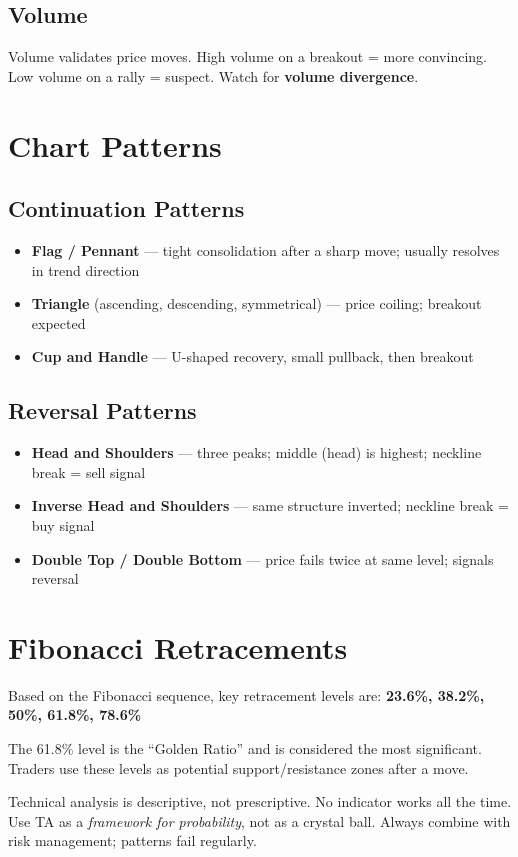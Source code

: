 \subsection{Volume}
Volume validates price moves. High volume on a breakout = more convincing.
Low volume on a rally = suspect. Watch for \textbf{volume divergence}.

\section{Chart Patterns}

\subsection{Continuation Patterns}
\begin{itemize}
  \item \textbf{Flag / Pennant} — tight consolidation after a sharp move; usually resolves in trend direction
  \item \textbf{Triangle} (ascending, descending, symmetrical) — price coiling; breakout expected
  \item \textbf{Cup and Handle} — U-shaped recovery, small pullback, then breakout
\end{itemize}

\subsection{Reversal Patterns}
\begin{itemize}
  \item \textbf{Head and Shoulders} — three peaks; middle (head) is highest; neckline break = sell signal
  \item \textbf{Inverse Head and Shoulders} — same structure inverted; neckline break = buy signal
  \item \textbf{Double Top / Double Bottom} — price fails twice at same level; signals reversal
\end{itemize}

\section{Fibonacci Retracements}

Based on the Fibonacci sequence, key retracement levels are:
\textbf{23.6\%, 38.2\%, 50\%, 61.8\%, 78.6\%}

The 61.8\% level is the ``Golden Ratio'' and is considered the most significant.
Traders use these levels as potential support/resistance zones after a move.

\begin{warningbox}
Technical analysis is descriptive, not prescriptive. No indicator works all the time.
Use TA as a \emph{framework for probability}, not as a crystal ball. Always combine
with risk management; patterns fail regularly.
\end{warningbox}
